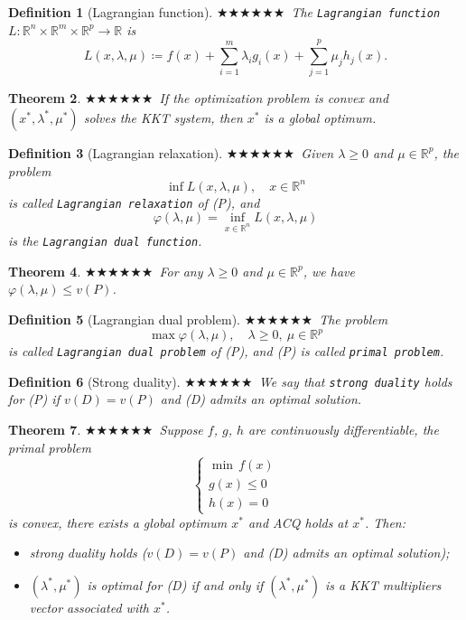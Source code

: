 \documentclass[11pt,a4paper]{article}
\newcommand{\g}{\texttt}
\newcommand{\R}{\mathbb{R}}
\theoremstyle{breakdef}
\newtheorem{definition}{Definition}[section]
\theoremstyle{breakplain}
\newtheorem{theorem}[definition]{Theorem}
\theoremstyle{remark}
\newcommand{\imp}[1]{\textcolor{impcolor}{%
  \ifcase#1\or$\bigstar$\or$\bigstar\bigstar$\or$\bigstar\bigstar\bigstar$\fi}\ }
\begin{document}
\begin{definition}[Lagrangian function]
    \imp{3}The \g{Lagrangian function} $L : \R^n \times \R^m \times \R^p \to \R$ is
    \[
        L(x, \lambda, \mu) \coloneqq f(x) + \sum_{i=1}^{m} \lambda_i g_i(x) + \sum_{j=1}^{p} \mu_j h_j(x).
    \]
\end{definition}

\begin{theorem}
    \imp{3}If the optimization problem is convex and $(x^*, \lambda^*, \mu^*)$ solves the KKT system, then $x^*$ is a global optimum.
\end{theorem}

\begin{definition}[Lagrangian relaxation]
    \imp{3}Given $\lambda \ge 0$ and $\mu \in \R^p$, the problem
    \[
        \inf L(x, \lambda, \mu), \quad x \in \R^n
    \]
    is called \g{Lagrangian relaxation} of (P), and
    \[
        \varphi(\lambda, \mu) = \inf_{x \in \R^n} L(x, \lambda, \mu)
    \]
    is the \g{Lagrangian dual function}.
\end{definition}

\begin{theorem}
    \imp{2}For any $\lambda \ge 0$ and $\mu \in \R^p$, we have $\varphi(\lambda, \mu) \le v(P)$.
\end{theorem}

\begin{definition}[Lagrangian dual problem]
    \imp{3}The problem
    \[
        \max \varphi(\lambda, \mu), \quad \lambda \ge 0,\ \mu \in \R^p \tag{D}
    \]
    is called \g{Lagrangian dual problem} of (P), and (P) is called \g{primal problem}.
\end{definition}

\begin{definition}[Strong duality]
    \imp{2}We say that \g{strong duality} holds for (P) if $v(D) = v(P)$ and (D) admits an optimal solution.
\end{definition}

\begin{theorem}
    \imp{3}Suppose $f$, $g$, $h$ are continuously differentiable, the primal problem
    \[
        \begin{cases}
            \min\, f(x)\\
            g(x) \le 0\\
            h(x) = 0
        \end{cases} \tag{P}
    \]
    is convex, there exists a global optimum $x^*$ and ACQ holds at $x^*$. Then:
    \begin{itemize}
        \item strong duality holds ($v(D) = v(P)$ and (D) admits an optimal solution);
        \item $(\lambda^*, \mu^*)$ is optimal for (D) if and only if $(\lambda^*, \mu^*)$ is a KKT multipliers vector associated with $x^*$.
    \end{itemize}
\end{theorem}
\end{document}
